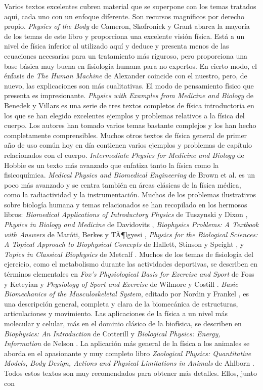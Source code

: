 ﻿\documentclass{book}
\begin{document}
Varios textos excelentes cubren material que se superpone con los temas tratados aquí, cada uno con un enfoque diferente. Son recursos magníficos por derecho propio. \textit{Physics of the Body} de Cameron, Skofronick y Grant \cite{1st-6} abarca la mayoría de los temas de este libro y proporciona una excelente visión física. Está a un nivel de física inferior al utilizado aquí y deduce y presenta menos de las ecuaciones necesarias para un tratamiento más riguroso, pero proporciona una base básica muy buena en fisiología humana para no expertos. En cierto modo, el énfasis de \textit{The Human Machine} de Alexander \cite{1st-2} coincide con el nuestro, pero, de nuevo, las explicaciones son más cualitativas. El modo de pensamiento físico que presenta es impresionante. \textit{Physics with Examples from Medicine and Biology} de Benedek y Villars \cite{1st-3} es una serie de tres textos completos de física introductoria en los que se han elegido excelentes ejemplos y problemas relativos a la física del cuerpo. Los autores han tomado varios temas bastante complejos y los han hecho completamente comprensibles. Muchos otros textos de física general de primer año de uso común hoy en día contienen varios ejemplos y problemas de capítulo relacionados con el cuerpo. \textit{Intermediate Physics for Medicine and Biology} de Hobbie \cite{1st-14} es un texto más avanzado que enfatiza tanto la física como la fisicoquímica. \textit{Medical Physics and Biomedical Engineering} de Brown et al. \cite{1st-4} es un poco más avanzado y se centra también en áreas clásicas de la física médica, como la radiactividad y la instrumentación. Muchos de los problemas ilustrativos sobre biología humana y temas relacionados se han recopilado en los hermosos libros: \textit{Biomedical Applications of Introductory Physics} de Tuszynski y Dixon \cite{1st-28}, \textit{Physics in Biology and Medicine} de Davidovits \cite{1st-9}, \textit{Biophysics Problems: A Textbook with Answers} de Maróti, Berkes y TÃ¶lgyesi \cite{1st-17}, \textit{Physics for the Biological Sciences: A Topical Approach to Biophysical Concepts} de Hallett, Stinson y Speight \cite{1st-12}, y \textit{Topics in Classical Biophysics} de Metcalf \cite{1st-18}. Muchos de los temas de fisiología del ejercicio, como el metabolismo durante las actividades deportivas, se describen en términos elementales en \textit{Fox's Physiological Basis for Exercise and Sport} de Foss y Keteyian \cite{1st-10} y \textit{Physiology of Sport and Exercise} de Wilmore y Costill \cite{1st-30}. \textit{Basic Biomechanics of the Musculoskeletal System}, editado por Nordin y Frankel \cite{1st-20}, es una descripción general, completa y clara de la biomecánica de estructuras, articulaciones y movimiento. Las aplicaciones de la física a un nivel más molecular y celular, más en el dominio clásico de la biofísica, se describen en \textit{Biophysics: An Introduction} de Cotterill \cite{1st-8} y \textit{Biological Physics: Energy, Information} de Nelson \cite{1st-19}. La aplicación más general de la física a los animales se aborda en el apasionante y muy completo libro \textit{Zoological Physics: Quantitative Models, Body Design, Actions and Physical Limitations in Animals} de Ahlborn \cite{1st-1}. Todos estos textos son muy recomendados para obtener más detalles. Ellos, junto con 
\end{document}
